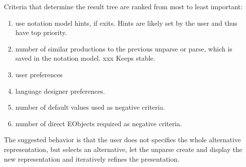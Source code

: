 Criteria that determine the result tree are ranked from most to least important:
\begin{enumerate}
	\item use notation model hints, if exits. Hints are likely set by the user and thus have top priority.
	\item number of similar productions to the previous unparse or parse, which is saved in the notation model. xxx Keeps stable.
	\item user preferences
	\item language designer preferences.
	\item number of default values used as negative criteria.
	\item number of direct EObjects required as negative criteria.
\end{enumerate}


The suggested behavior is that the user does not specifies the whole alternative representation, but selects an alternative, let the unparse create and display the new representation and iteratively refines the presentation. 